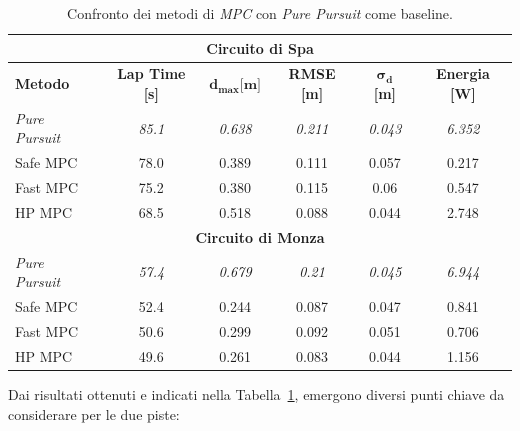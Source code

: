 \begin{table}[H]
\centering
\begin{tabular}{|l|c|c|c|c|c|}
\hline
\multicolumn{6}{|c|}{\textbf{Circuito di Spa}} \\
\hline
\textbf{Metodo} & \textbf{Lap Time [s]} & $\bm{d}_\textbf{max} \textbf{[m]}$ & \textbf{RMSE [m]} & $\bm{\sigma}_\textbf{d}$ \textbf{[m]} & \textbf{Energia [W]} \\
\hline
\textit{Pure Pursuit} & \textit{85.1} & \textit{0.638} & \textit{0.211} & \textit{0.043} & \textit{6.352} \\
\hline
Safe MPC & 78.0 & 0.389 & 0.111 & 0.057 & 0.217 \\
Fast MPC & 75.2 & 0.380 & 0.115 & 0.06 & 0.547 \\
HP MPC & 68.5 & 0.518 & 0.088 & 0.044 & 2.748 \\
\hline
\multicolumn{6}{|c|}{\textbf{Circuito di Monza}} \\
\hline
\textit{Pure Pursuit} & \textit{57.4} & \textit{0.679} & \textit{0.21} & \textit{0.045} & \textit{6.944} \\
\hline
Safe MPC & 52.4 & 0.244 & 0.087 & 0.047 & 0.841 \\
Fast MPC & 50.6 & 0.299 & 0.092 & 0.051 & 0.706 \\
HP MPC & 49.6 & 0.261 & 0.083 & 0.044 & 1.156 \\
\hline
\end{tabular}
\caption{Confronto dei metodi di \textit{MPC} con \textit{Pure Pursuit} come baseline.}
\label{tab:spa_monza_mpc_comparison}
\end{table}
Dai risultati ottenuti e indicati nella Tabella~\ref{tab:spa_monza_mpc_comparison},
emergono diversi punti chiave da considerare per le due piste:
